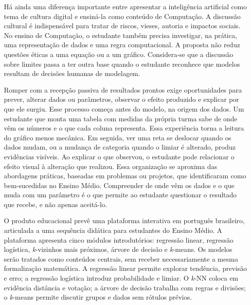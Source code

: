 Há ainda uma diferença importante entre apresentar a inteligência artificial como tema de cultura digital e ensiná-la como conteúdo de Computação. A discussão cultural é indispensável para tratar de riscos, vieses, autoria e impactos sociais. No ensino de Computação, o estudante também precisa investigar, na prática, uma representação de dados e uma regra computacional. A proposta não reduz questões éticas a uma equação ou a um gráfico. Considera-se que a discussão sobre limites passa a ter outra base quando o estudante reconhece que modelos resultam de decisões humanas de modelagem.

Romper com a recepção passiva de resultados prontos exige oportunidades para prever, alterar dados ou parâmetros, observar o efeito produzido e explicar por que ele surgiu. Esse processo começa antes do modelo, na origem dos dados. Um estudante que monta uma tabela com medidas da própria turma sabe de onde vêm os números e o que cada coluna representa. Essa experiência torna a leitura do gráfico menos mecânica. Em seguida, ver uma reta se deslocar quando os dados mudam, ou a mudança de categoria quando o limiar é alterado, produz evidências visíveis. Ao explicar o que observou, o estudante pode relacionar o efeito visual à alteração que realizou. Essa organização se aproxima das abordagens práticas, baseadas em problemas ou projetos, que  identificaram como bem-sucedidas no Ensino Médio. Compreender de onde vêm os dados e o que muda com um parâmetro é o que permite ao estudante questionar o resultado que recebe, e não apenas aceitá-lo.

O produto educacional prevê uma plataforma interativa em português brasileiro, articulada a uma sequência didática para estudantes do Ensino Médio. A plataforma apresenta cinco módulos introdutórios: regressão linear, regressão logística, \textit{k}-vizinhos mais próximos, árvore de decisão e \textit{k}-means. Os modelos serão tratados como conteúdos centrais, sem receber necessariamente a mesma formalização matemática. A regressão linear permite explorar tendência, previsão e erro; a regressão logística introduz probabilidade e limiar. O \textit{k}-NN coloca em evidência distância e votação; a árvore de decisão trabalha com regras e divisões; o \textit{k}-means permite discutir grupos e dados sem rótulos prévios.

